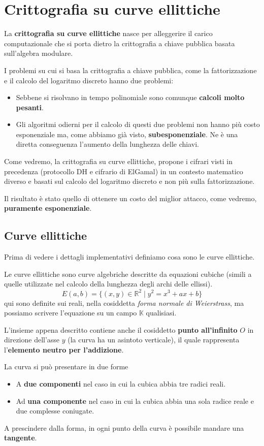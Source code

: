 \chapter{Crittografia su curve ellittiche}
La \textbf{crittografia su curve ellittiche} nasce per alleggerire il carico computazionale che si porta dietro
la crittografia a chiave pubblica basata sull'algebra modulare.

I problemi su cui si basa la crittografia a chiave pubblica, come la fattorizzazione e il calcolo del logaritmo
discreto hanno due problemi:
\begin{itemize}
	\item Sebbene si risolvano in tempo polinomiale sono comunque \textbf{calcoli molto pesanti}.
	\item Gli algoritmi odierni per il calcolo di questi due problemi non hanno pi\`u costo esponenziale ma,
	      come abbiamo gi\`a visto, \textbf{subesponenziale}. Ne \`e una diretta conseguenza l'aumento della
	      lunghezza delle chiavi.
\end{itemize}
Come vedremo, la crittografia su curve ellittiche, propone i cifrari visti in precedenza (protocollo DH e cifrario
di ElGamal) in un contesto matematico diverso e basati sul calcolo del logaritmo discreto e non pi\`u sulla
fattorizzazione.

Il risultato \`e stato quello di ottenere un costo del miglior attacco, come vedremo, \textbf{puramente esponenziale}.

\section{Curve ellittiche}
Prima di vedere i dettagli implementativi definiamo cosa sono le curve ellittiche.

Le curve ellittiche sono curve algebriche descritte da equazioni cubiche (simili a quelle utilizzate nel calcolo
della lunghezza degli archi delle ellissi).
\[ E(a, b) = \{ (x, y) \in \mathbb{R}^2 \mid y^2 = x^3 + ax + b \} \]
qui sono definite sui reali, nella cosiddetta \emph{forma normale di Weierstrass}, ma possiamo scrivere l'equazione
su un campo $\mathbb{K}$ qualisiasi.

L'insieme appena descritto contiene anche il cosiddetto \textbf{punto all'infinito} $O$ in direzione dell'asse $y$
(la curva ha un asintoto verticale), il quale rappresenta l'\textbf{elemento neutro per l'addizione}.

La curva si pu\`o presentare in due forme
\begin{itemize}
	\item A \textbf{due componenti} nel caso in cui la cubica abbia tre radici reali.
	\item Ad \textbf{una componente} nel caso in cui la cubica abbia una sola radice reale e due complesse coniugate.
\end{itemize}
A prescindere dalla forma, in ogni punto della curva \`e possibile mandare una \textbf{tangente}.

